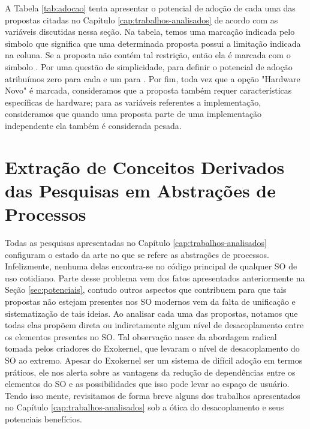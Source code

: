 A Tabela \ref{tab:adocao} tenta apresentar o potencial de adoção de cada uma
das propostas citadas no Capítulo \ref{cap:trabalhos-analisados} de acordo com
as variáveis discutidas nessa seção. Na tabela, temos uma marcação indicada
pelo simbolo  que significa que uma determinada proposta possui a
limitação indicada na coluna. Se a proposta não contém tal restrição, então ela
é marcada com o simbolo . Por uma questão de simplicidade, para
definir o potencial de adoção atribuímos zero para cada  e um para
. Por fim, toda vez que a opção "Hardware Novo" é marcada,
consideramos que a proposta também requer características específicas de
hardware; para as variáveis referentes a implementação, consideramos que quando
uma proposta parte de uma implementação independente ela também é considerada
pesada.



\section{Extração de Conceitos Derivados das Pesquisas em Abstrações de Processos}

Todas as pesquisas apresentadas no Capítulo \ref{cap:trabalhos-analisados}
configuram o estado da arte no que se refere as abstrações de processos.
Infelizmente, nenhuma delas encontra-se no código principal de qualquer SO de
uso cotidiano. Parte desse problema vem dos fatos apresentados anteriormente na Seção
\ref{sec:potenciais}, contudo outros aspectos que contribuem para que tais
propostas não estejam presentes nos SO modernos vem da falta de unificação e
sistematização de tais ideias. Ao analisar cada uma das propostas, notamos que
todas elas propõem direta ou indiretamente algum nível de desacoplamento entre
os elementos presentes no SO. Tal observação nasce da abordagem radical tomada
pelos criadores do Exokernel, que levaram o nível de desacoplamento do SO ao
extremo. Apesar do Exokernel ser um sistema de difícil adoção em termos
práticos, ele nos alerta sobre as vantagens da redução de dependências
entre os elementos do SO e as possibilidades que isso pode levar ao espaço de
usuário. Tendo isso mente, revisitamos de forma breve alguns dos trabalhos
apresentados no Capítulo \ref{cap:trabalhos-analisados} sob a ótica do
desacoplamento e seus potenciais benefícios.

